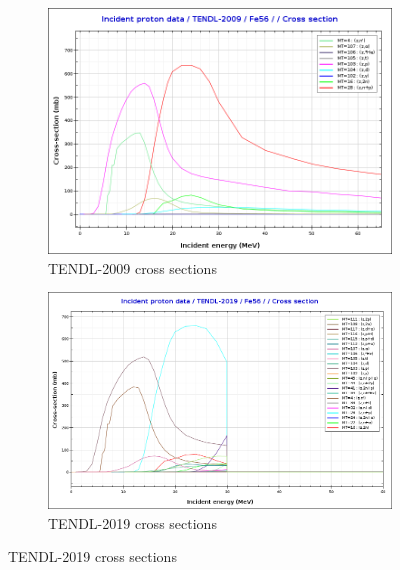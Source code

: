 \begin{figure}[htb]
\centering
\begin{subfigure}{0.49\textwidth}
  \includegraphics[width=\linewidth]{chapters/activity_code/tendl-fe56/tendl_2009_p_fe56.png}
  \caption{TENDL-2009 cross sections}
  \label{fig:xsdata-tendl2009}
\end{subfigure}\hfil %
\begin{subfigure}{0.49\textwidth}
  \includegraphics[width=\linewidth]{chapters/activity_code/tendl-fe56/tendl_2019_p_fe56.png}
  \caption{TENDL-2019 cross sections}
  \label{fig:xsdata-tendl2019}
\end{subfigure}


\end{figure}

